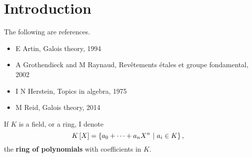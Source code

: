





\section{Introduction}


The following are references.
\begin{itemize}
\item E Artin, Galois theory, 1994
\item A Grothendieck and M Raynaud, Rev\^etements \'etales et groupe fondamental, 2002
\item I N Herstein, Topics in algebra, 1975
\item M Reid, Galois theory, 2014
\end{itemize}

\begin{notation*}
If $ K $ is a field, or a ring, I denote
$$ K\sbr{X} = \cbr{a_0 + \dots + a_nX^n \st a_i \in K}, $$
the \textbf{ring of polynomials} with coefficients in $ K $.
\end{notation*}

